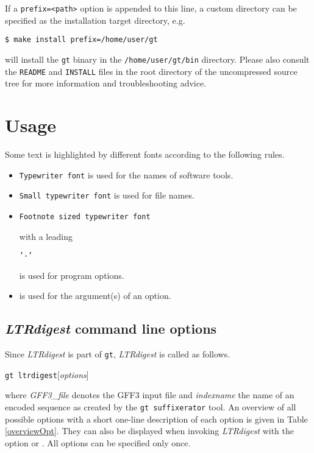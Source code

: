 \documentclass[12pt,titlepage]{article}
\newcommand{\LTRdigest}{\textit{LTRdigest}\xspace}
\newcommand{\GtLTRdigest}{\texttt{gt ltrdigest}\xspace}
\newcommand{\Gt}{\texttt{gt}\xspace}
\newcommand{\Gtsuffixerator}{\texttt{gt suffixerator}\xspace}
\begin{document}
If a \texttt{prefix=<path>} option is appended to this line, a custom directory
can be specified as the installation target directory, e.g.\@

\begin{verbatim}
$ make install prefix=/home/user/gt
\end{verbatim}%

will install the \Gt binary in the \texttt{/home/user/gt/bin} directory.
Please also consult the \texttt{README} and \texttt{INSTALL} files in the root
directory of the uncompressed source tree for more information and
troubleshooting advice.

\section{Usage} \label{Usage}

Some text is highlighted by different fonts according to the following rules.

\begin{itemize}
\item \texttt{Typewriter font} is used for the names of software tools.
\item \texttt{\small{Small typewriter font}} is used for file names.
\item \begin{footnotesize}\texttt{Footnote sized typewriter font}
      \end{footnotesize} with a leading
      \begin{footnotesize}\texttt{'-'}\end{footnotesize}
      is used for program options.
\item {} is used for the argument(s) of an
      option.
\end{itemize}

\subsection{\LTRdigest command line options}

Since \LTRdigest is part of \Gt, \LTRdigest is called as follows.

\GtLTRdigest  $[$\emph{options}$]$  

where \emph{GFF3\_file} denotes the GFF3 input file and \emph{indexname} the
name of an encoded sequence as created by the \Gtsuffixerator tool.  An overview
of all possible options with a short one-line description of each option is
given in Table \ref{overviewOpt}. They can also be displayed when invoking
\LTRdigest with the option  or .  All options
can be specified only once.
\end{document}
